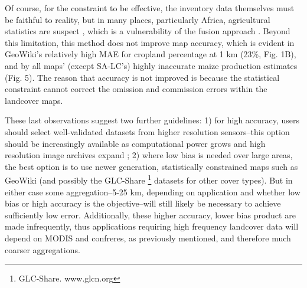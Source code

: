 \documentclass{pnastwo}
\begin{document}
\begin{article}

Of course, for the constraint to be effective, the inventory data themselves must be faithful to reality, but in many places, particularly Africa, agricultural statistics are suspect \cite{carletto_emperor_2013, fao_action_2013}, which is a vulnerability of the fusion approach \cite{see_improved_2015}. Beyond this limitation, this method does not improve map accuracy, which is evident in GeoWiki's relatively high MAE for cropland percentage at 1 km (23\%, Fig. 1B), and by all maps' (except SA-LC's) highly inaccurate maize production estimates (Fig. 5). The reason that accuracy is not improved is because the statistical constraint cannot correct the omission and commission errors within the landcover maps.  

These last observations suggest two further guidelines: 1) for high accuracy, users should select well-validated datasets from higher resolution sensors--this option should be increasingly available as computational power grows and high resolution image archives expand \cite{hansen_high-resolution_2013,chen_global_2015}; 2) where low bias is needed over large areas, the best option is to use newer generation, statistically constrained maps such as GeoWiki (and possibly the GLC-Share \footnote{GLC-Share. www.glcn.org} datasets for other cover types). But in either case some aggregation--5-25 km, depending on application and whether low bias or high accuracy is the objective--will still likely be necessary to achieve sufficiently low error. Additionally, these higher accuracy, lower bias product are made infrequently, thus applications requiring high frequency landcover data will depend on MODIS and confreres, as previously mentioned, and therefore much coarser aggregations.  



\end{article}
\end{document}
